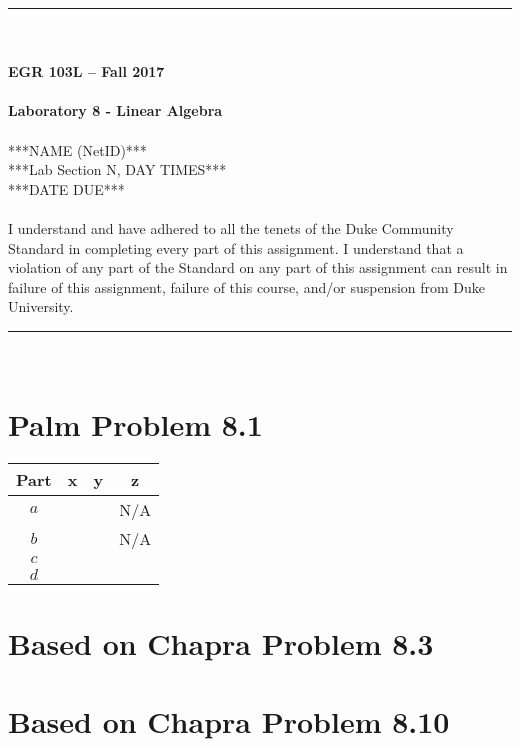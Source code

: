 \documentclass{article}
\begin{document}
\begin{center}
\rule{6.5in}{0.5mm}\\~\\
\textbf{\large EGR 103L -- Fall 2017}\\~\\
\textbf{\huge Laboratory 8 - Linear Algebra}\\~\\
***NAME (NetID)***\\
***Lab Section N, DAY TIMES***\\
***DATE DUE***\\~\\
{\small I understand and have adhered to all the tenets of the Duke
  Community Standard in completing every part of this assignment.  I
  understand that a violation of any part of the Standard on any part
  of this assignment can result in failure of this assignment, failure
  of this course, and/or suspension from Duke University.} 
\rule{6.5in}{0.5mm}\\
\end{center}
\tableofcontents
\listoffigures
\pagebreak
\section{Palm Problem 8.1}
\renewcommand{\arraystretch}{1.5}
\begin{center}
\begin{tabular}{|c||c|c|c|}\hline
Part & x & y & z \\ \hline \hline
$a$ &  &  & N/A\\ \hline
$b$ &  &  & N/A \\ \hline
$c$ &  &  & \\ \hline
$d$ &  &  & \\ \hline
\end{tabular}
\end{center}

\section{Based on Chapra Problem 8.3}

\section{Based on Chapra Problem 8.10}
\end{document}
